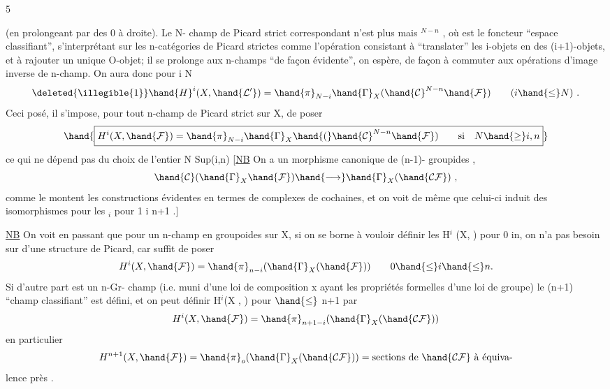  \hfill 5

(en prolongeant  par des 0 à droite). Le N- champ de Picard
strict correspondant n'est plus  mais $^{N-n}$  , où  est le
foncteur ``espace classifiant'', s'interprétant sur les n-catégories de Picard
strictes comme l'opération consistant à ``translater'' les i-objets en des
(i+1)-objets, et à rajouter un unique O-objet; il se prolonge aux n-champs 
``de façon évidente'', on espère, de façon à commuter aux opérations d'image
inverse de n-champ. On aura donc pour i \hand{$\leq$} N
\[ \deleted{\illegible{1}}\hand{H}^{i}(X, \hand{\mathcal{L}'}) = \hand{\pi}_{N-i}\hand{\Gamma}_{X}(\hand{\mathcal{C}}^{N-n}\hand{\mathcal{F}}) \qquad (i \hand{\leq} N) \ . \]
Ceci posé, il s'impose, pour tout n-champ de Picard strict  sur X, de
poser
\[ \hand{\boxed{\normalcolor H^{i}(X , \hand{\mathcal{F}} ) = \hand{\pi}_{N-i}\hand{\Gamma}_{X}\hand{(}\hand{\mathcal{C}}^{N-n} \hand{\mathcal{F}} ) \qquad \text{si} \quad N \hand{\geq} i,n}} \]
ce qui ne dépend pas du choix de l'entier N \hand{$\geq$} Sup(i,n) [\uline{NB} On a un
morphisme canonique de (n-1)- groupides ,
\[ \hand{\mathcal{C}}(\hand{\Gamma}_{X}\hand{\mathcal{F}}) \hand{\longrightarrow} \hand{\Gamma}_{X}(\hand{\mathcal{C}\mathcal{F}}) \ , \]
comme le montent les constructions évidentes en termes de complexes de
cochaines, et on voit de même que celui-ci induit des isomorphismes pour
les \hand{$\pi$}$_{i}$ pour 1 \hand{$\leq$}i \hand{$\leq$} n+1 .]

\uline{NB} On voit en passant que pour un n-champ en groupoides  sur X, si
on se borne à vouloir définir les H$^{i}$ (X, ) pour 0 \hand{$\leq$} i\hand{$\leq$}n, on n'a pas
besoin sur  d'une structure de Picard, car  suffit de poser
\[ H^{i}( X , \hand{\mathcal{F}} ) = \hand{\pi}_{n-i}(\hand{\Gamma}_{X}(\hand{\mathcal{F}})) \qquad 0 \hand{\leq} i \hand{\leq} n. \]
Si d'autre part  est un n-Gr- champ (i.e. muni d'une loi de composition
 x  \hand{$\longrightarrow$}  ayant les propriétés formelles d'une loi de groupe)
\deleted{\unsure{(}}le (n+1) ``champ classifiant''\deleted{\unsure{)}} est défini, et on peut définir H$^{i}$(X ,  )
pour  $\hand{\leq}$ n+1 par
\[ H^{i}( X , \hand{\mathcal{F}} ) = \hand{\pi}_{n+1-i} ( \hand{\Gamma}_{X}(\hand{\mathcal{C}\mathcal{F}})) \]
en particulier
\[ H^{n+1} (X , \hand{\mathcal{F}}) = \hand{\pi}_{o}(\hand{\Gamma}_{X}(\hand{\mathcal{C}\mathcal{F}})) = \text{sections de } \hand{\mathcal{C}\mathcal{F}} \text{ à équiva-}\]
lence près .

